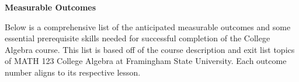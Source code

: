 \documentclass[12pt]{article}
\theoremstyle{definition}
\begin{document}
\setcounter{page}{3}
{\bf \large Measurable Outcomes}
\hfill \doclicenseImage[imagewidth=5em]\\
\par
Below is a comprehensive list of the anticipated measurable outcomes and some essential prerequisite skills needed for successful completion of the College Algebra course.  This list is based off of the course description and exit list topics of MATH 123 College Algebra at Framingham State University.  Each outcome number aligns to its respective lesson.
\end{document}
